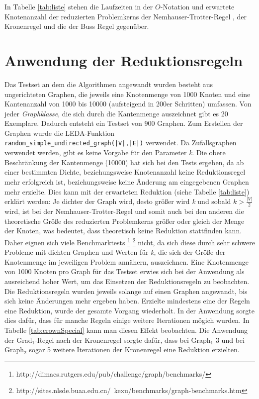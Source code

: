 In Tabelle \ref{tab:liste} stehen die Laufzeiten in der $O$-Notation und erwartete Knotenanzahl der reduzierten Problemkerns der Nemhauser-Trotter-Regel \cite{fixed}, der Kronenregel \cite{fixed} \cite{manual} und die der Buss Regel \cite{fixed} gegenüber.
\section{Anwendung der Reduktionsregeln}
\label{ch:Analyse:sec:Anwendung}

Das Testset an dem die Algorithmen angewandt wurden besteht aus ungerichteten Graphen, die jeweils eine Knotenmenge von 1000 Knoten und eine Kantenanzahl von 1000 bis 10000 (aufsteigend in 200er Schritten) umfassen. Von jeder \emph{Graphklasse}, die sich durch die Kantenmenge auszeichnet gibt es 20 Exemplare. Dadurch entsteht ein Testset von 900 Graphen. Zum Erstellen der Graphen wurde die LEDA-Funktion \lstinline{random_simple_undirected_graph(|V|,|E|)} \cite{manual} verwendet. Da Zufallsgraphen verwendet werden, gibt es keine Vorgabe für den Parameter \emph{k}. Die obere Beschränkung der Kantenmenge (10000) hat sich bei den Tests ergeben, da ab einer bestimmten Dichte, beziehungsweise Knotenanzahl keine Reduktionsregel mehr erfolgreich ist, beziehungsweise keine Änderung am eingegebenen Graphen mehr erzielte. Dies kann mit der erwarteten Reduktion (siehe Tabelle \ref{tab:liste}) erklärt werden: Je dichter der Graph wird, desto größer wird \emph{k} und sobald $k>\frac{|V|}{2}$ wird, ist bei der Nemhauser-Trotter-Regel und somit auch bei den anderen die theoretische Größe des reduzierten Problemkerns größer oder gleich der Menge der Knoten, was bedeutet, dass theoretisch keine Reduktion stattfinden kann. Daher eignen sich viele Benchmarktests \footnote{http://dimacs.rutgers.edu/pub/challenge/graph/benchmarks/} \footnote{http://sites.nlsde.buaa.edu.cn/~kexu/benchmarks/graph-benchmarks.htm} nicht, da sich diese durch sehr schwere Probleme mit dichten Graphen und Werten für \emph{k}, die sich der Größe der Knotenmenge im jeweiligen Problem annähern, auszeichnen. Eine Knotenmenge von 1000 Knoten pro Graph für das Testset erwies sich bei der Anwendung als ausreichend hoher Wert, um das Einsetzen der Reduktionsregeln zu beobachten.\\
Die Reduktionsregeln wurden jeweils solange auf einen Graphen angewandt, bis sich keine Änderungen mehr ergeben haben. Erzielte mindestens eine der Regeln eine Reduktion, wurde der gesamte Vorgang wiederholt. In der Anwendung sorgte dies dafür, dass für manche Regeln einige weitere Iterationen mögich wurden. In Tabelle \ref{tab:crownSpecial} kann man diesen Effekt beobachten. Die Anwendung der Grad$_{1}$-Regel nach der Kronenregel sorgte dafür, dass bei Graph$_{1}$ 3 und bei Graph$_{2}$ sogar 5 weitere Iterationen der Kronenregel eine Reduktion erzielten.
